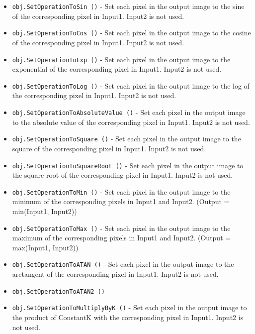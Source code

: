 \begin{itemize}
\item  \verb|obj.SetOperationToSin ()| -  Set each pixel in the output image to the sine of the corresponding pixel
 in Input1. Input2 is not used.

\item  \verb|obj.SetOperationToCos ()| -  Set each pixel in the output image to the cosine of the corresponding pixel
 in Input1. Input2 is not used.

\item  \verb|obj.SetOperationToExp ()| -  Set each pixel in the output image to the exponential of the corresponding pixel
 in Input1. Input2 is not used.

\item  \verb|obj.SetOperationToLog ()| -  Set each pixel in the output image to the log of the corresponding pixel
 in Input1. Input2 is not used.

\item  \verb|obj.SetOperationToAbsoluteValue ()| -  Set each pixel in the output image to the absolute value of the corresponding pixel
 in Input1. Input2 is not used.

\item  \verb|obj.SetOperationToSquare ()| -  Set each pixel in the output image to the square of the corresponding pixel
 in Input1. Input2 is not used.

\item  \verb|obj.SetOperationToSquareRoot ()| -  Set each pixel in the output image to the square root of the corresponding pixel
 in Input1. Input2 is not used.

\item  \verb|obj.SetOperationToMin ()| -  Set each pixel in the output image to the minimum of the corresponding pixels
 in Input1 and Input2. (Output = min(Input1, Input2))

\item  \verb|obj.SetOperationToMax ()| -  Set each pixel in the output image to the maximum of the corresponding pixels
 in Input1 and Input2. (Output = max(Input1, Input2))

\item  \verb|obj.SetOperationToATAN ()| -  Set each pixel in the output image to the arctangent of the corresponding pixel
 in Input1. Input2 is not used.

\item  \verb|obj.SetOperationToATAN2 ()|

\item  \verb|obj.SetOperationToMultiplyByK ()| -  Set each pixel in the output image to the product of ConstantK with the
 corresponding pixel in Input1. Input2 is not used.


\end{itemize}
